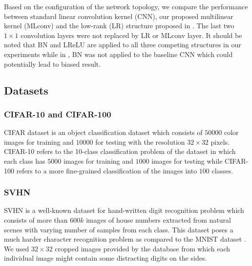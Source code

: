 \documentclass[conference,usletter]{IEEEtran}
\begin{document}
Based on the configuration of the network topology, we compare the performance between standard linear convolution kernel (CNN), our proposed multilinear kernel (MLconv) and the low-rank (LR) structure proposed in \cite{tai2015convolutional}. The last two $1\times1$ convolution layers were not replaced by LR or MLconv layer. It should be noted that BN and LReLU are applied to all three competing structures in our experiments while in \cite{tai2015convolutional}, BN was not applied to the baseline CNN which could potentially lead to biased result.



\subsection{Datasets}
\subsubsection{CIFAR-10 and CIFAR-100}
CIFAR dataset \cite{krizhevsky2009learning} is an object classification dataset which consists of $50000$ color images for training and $10000$ for testing with the resolution $32\times32$ pixels. CIFAR-10 refers to the 10-class classification problem of the dataset in which each class has $5000$ images for training and $1000$ images for testing while CIFAR-100 refers to a more fine-grained classification of the images into $100$ classes.

\subsubsection{SVHN}
SVHN \cite{netzer2011reading} is a well-known dataset for hand-written digit recognition problem which consists of more than $600k$ images of house numbers extracted from natural scenes with varying number of samples from each class. This dataset poses a much harder character recognition problem as compared to the MNIST dataset \cite{lecun1998gradient}. We used $32\times32$ cropped images provided by the database from which each individual image might contain some distracting digits on the sides.
\end{document}
